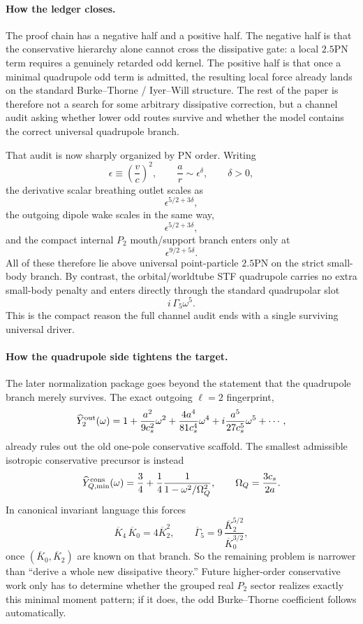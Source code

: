 \documentclass[11pt]{article}
\begin{document}
\paragraph{How the ledger closes.}
The proof chain has a negative half and a positive half.  The negative half is
that the conservative hierarchy alone cannot cross the dissipative gate: a local
$2.5$PN term requires a genuinely retarded odd kernel.  The positive half is
that once a minimal quadrupole odd term is admitted, the resulting local force
already lands on the standard Burke--Thorne / Iyer--Will structure.  The rest of
the paper is therefore not a search for some arbitrary dissipative correction,
but a channel audit asking whether lower odd routes survive and whether the model
contains the correct universal quadrupole branch.

That audit is now sharply organized by PN order.  Writing
\[
\epsilon \equiv \left(\frac{v}{c}\right)^2,
\qquad
\frac{a}{r}\sim \epsilon^\delta,
\qquad \delta>0,
\]
the derivative scalar breathing outlet scales as
\[
\epsilon^{5/2+3\delta},
\]
the outgoing dipole wake scales in the same way,
\[
\epsilon^{5/2+3\delta},
\]
and the compact internal $P_2$ mouth/support branch enters only at
\[
\epsilon^{9/2+5\delta}.
\]
All of these therefore lie above universal point-particle $2.5$PN on the strict
small-body branch.  By contrast, the orbital/worldtube STF quadrupole carries no
extra small-body penalty and enters directly through the standard quadrupolar
slot
\[
i\,\Gamma_5\omega^5.
\]
This is the compact reason the full channel audit ends with a single surviving
universal driver.

\paragraph{How the quadrupole side tightens the target.}
The later normalization package goes beyond the statement that the quadrupole
branch merely survives.  The exact outgoing $\ell=2$ fingerprint,
\[
\widehat Y_2^{\rm out}(\omega)
=
1+\frac{a^2}{9c_s^2}\omega^2
+\frac{4a^4}{81c_s^4}\omega^4
+i\frac{a^5}{27c_s^5}\omega^5+\cdots,
\]
already rules out the old one-pole conservative scaffold.  The smallest
admissible isotropic conservative precursor is instead
\[
\widehat Y_{Q,\min}^{\rm cons}(\omega)
=
\frac34+\frac14\frac{1}{1-\omega^2/\Omega_Q^2},
\qquad
\Omega_Q=\frac{3c_s}{2a}.
\]
In canonical invariant language this forces
\[
\overline K_4\,\overline K_0 = 4\overline K_2^2,
\qquad
\overline\Gamma_5
=
9\,\frac{\overline K_2^{5/2}}{\overline K_0^{3/2}},
\]
once $(\overline K_0,\overline K_2)$ are known on that branch.  So the remaining
problem is narrower than ``derive a whole new dissipative theory.''  Future
higher-order conservative work only has to determine whether the grouped real
$P_2$ sector realizes exactly this minimal moment pattern; if it does, the odd
Burke--Thorne coefficient follows automatically.
\end{document}
